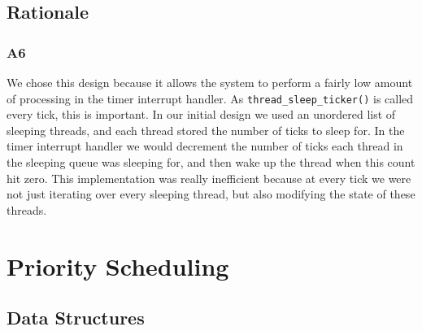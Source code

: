 \documentclass[a4wide, 11pt]{article}
\newcommand{\tx}{\texttt}
\begin{document}
\subsection{Rationale}
\subsubsection{A6}
We chose this design because it allows the system to perform a fairly low amount of processing in the timer interrupt handler. As \tx{thread\_sleep\_ticker()} is called every tick, this is important. In our initial design we used an unordered list of sleeping threads, and each thread stored the number of ticks to sleep for. In the timer interrupt handler we would decrement the number of ticks each thread in the sleeping queue was
sleeping for, and then wake up the thread when this count hit zero. This implementation was really inefficient because at every tick we were not just iterating over every sleeping thread, but also modifying the state of these threads.
\newpage


\section{Priority Scheduling}
\subsection{Data Structures}
\end{document}
